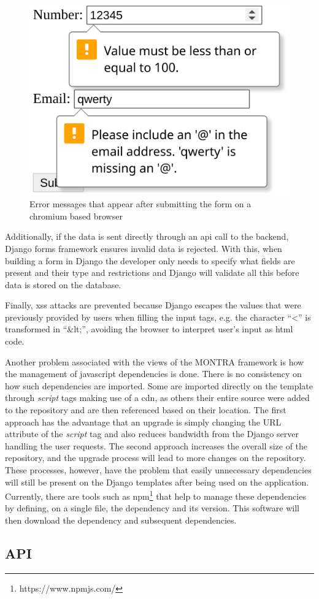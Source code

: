 \begin{figure}[H]
    \center
    \includegraphics[width=.3\textwidth]{html-form-validation}
    \caption{Error messages that appear after submitting the form on a chromium based browser}
    \label{fig:html-form-validation}
\end{figure}

Additionally, if the data is sent directly through an \gls{api} call to the backend, Django forms framework ensures invalid data is rejected.
With this, when building a form in Django the developer only needs to specify what fields are present and their type and restrictions and Django will validate all this before data is stored on the database.

Finally, \gls{xss} attacks are prevented because Django escapes the values that were previously provided by users when filling the input tags, e.g. the character ``<'' is transformed in ``\&lt;'', avoiding the browser to interpret user's input as \gls{html} code.

Another problem associated with the views of the MONTRA framework is how the management of javascript dependencies is done.
There is no consistency on how such dependencies are imported.
Some are imported directly on the template through \textit{script} tags making use of a \gls{cdn}, as others their entire source were added to the repository and are then referenced based on their location.
The first approach has the advantage that an upgrade is simply changing the URL attribute of the \textit{script} tag and also reduces bandwidth from the Django server handling the user requests.
The second approach increases the overall size of the repository, and the upgrade process will lead to more changes on the repository.
These processes, however, have the problem that easily unnecessary dependencies will still be present on the Django templates after being used on the application.
Currently, there are tools such as \gls{npm}\footnote{https://www.npmjs.com/} that help to manage these dependencies by defining, on a single file, the dependency and its version.
This software will then download the dependency and subsequent dependencies.

\subsection*{API}

